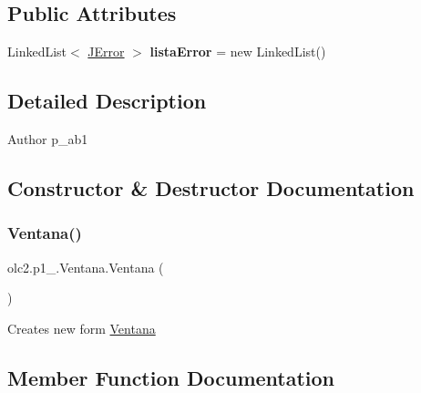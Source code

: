 \subsection*{Public Attributes}
\begin{DoxyCompactItemize}
\item 
\mbox{\label{classolc2_1_1p1__201504242_1_1_ventana_a2c943cc0666abd75d572f7cceb873e9c}} 
Linked\+List$<$ \mbox{\hyperlink{classolc2_1_1p1__201504242_1_1_j_error}{J\+Error}} $>$ {\bfseries lista\+Error} = new Linked\+List()
\end{DoxyCompactItemize}


\subsection{Detailed Description}
\begin{DoxyAuthor}{Author}
p\+\_\+ab1 
\end{DoxyAuthor}


\subsection{Constructor \& Destructor Documentation}
\mbox{\label{classolc2_1_1p1__201504242_1_1_ventana_af29a17e75dff62d1fe1fe4727989b63a}} 
\subsubsection{\texorpdfstring{Ventana()}{Ventana()}}
{\footnotesize\ttfamily olc2.\+p1\+\_.\+Ventana.\+Ventana (\begin{DoxyParamCaption}{ }\end{DoxyParamCaption})}

Creates new form \mbox{\hyperlink{classolc2_1_1p1__201504242_1_1_ventana}{Ventana}} 

\subsection{Member Function Documentation}
\mbox{\label{classolc2_1_1p1__201504242_1_1_ventana_a8ec2c001f5d8f7f18fd9da6429e0e3c0}} 
